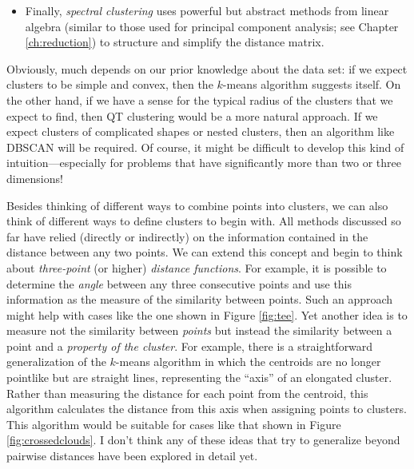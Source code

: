 \begin{itemize}
\item Finally, \emph{spectral clustering}  uses powerful but abstract
  methods from linear algebra (similar to those used for principal
  component analysis; see Chapter \ref{ch:reduction}) to structure and
  simplify the distance matrix.
\end{itemize}

Obviously, much depends on our prior knowledge about the data set: if
we expect clusters to be simple and convex, then the $k$-means
algorithm suggests itself.  On the other hand, if we have a sense for
the typical radius of the clusters that we expect to find, then QT
clustering would be a more natural approach. If we expect clusters of
complicated shapes or nested clusters, then an algorithm like DBSCAN
will be required.  Of course, it might be difficult to develop this
kind of intuition---especially for problems that have significantly
more than two or three dimensions!

%

Besides thinking of different ways to combine points into clusters, we
can also think of different ways to define clusters to begin with. All
methods discussed so far have relied (directly or indirectly) on the
information contained in the distance between any two points. We can
extend this concept and begin to think about \emph{three-point} (or
higher) \emph{distance functions}. For example, it is possible to
determine the \emph{angle} between any three consecutive points and
use this information as the measure of the similarity between points. Such
an approach might help with cases like the one shown in Figure
\ref{fig:tee}. Yet another idea is to measure not the similarity
between \emph{points} but instead the similarity between a point and a
\emph{property of the cluster}. For example, there is a
straightforward generalization of the $k$-means algorithm in which the
centroids are no longer pointlike but are straight lines, representing
the ``axis'' of an elongated cluster. Rather than measuring the
distance for each point from the centroid, this algorithm calculates
the distance from this axis when assigning points to clusters. This
algorithm would be suitable for cases like that shown in Figure
\ref{fig:crossedclouds}. I don't think any of these ideas that try to
generalize beyond pairwise distances have been explored in detail yet.
  
